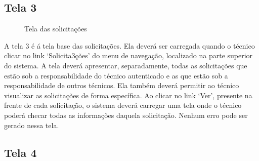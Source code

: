\newpage

\subsection{Tela 3}

\begin{figure}[ht]
    \centering
    \caption{Tela das solicitações}
\end{figure}

A tela 3 é á tela base das solicitações. Ela deverá ser carregada quando o técnico clicar no link ‘Solicita3ções’ do menu de navegação, localizado na parte superior do sistema. A tela deverá apresentar, separadamente, todas as solicitações que estão sob a responsabilidade do técnico autenticado e as que estão sob a responsabilidade de outros técnicos. Ela também deverá permitir ao técnico visualizar as solicitações de forma específica. Ao clicar no link ‘Ver’, presente na frente de cada solicitação, o sistema deverá carregar uma tela onde o técnico poderá checar todas as informações daquela solicitação. Nenhum erro pode ser gerado nessa tela.

\newpage

\subsection{Tela 4}

